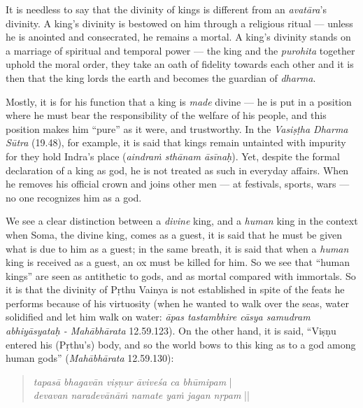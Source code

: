 It is needless to say that the divinity of kings is different from an {\sl avatāra}’s divinity. A king’s divinity is bestowed on him through a religious ritual --- unless he is anointed and consecrated, he remains a mortal. A king’s divinity stands on a marriage of spiritual and temporal power --- the king and the {\sl purohita} together uphold the moral order, they take an oath of fidelity towards each other and it is then that the king lords the earth and becomes the guardian of {\sl dharma}.

Mostly, it is for his function that a king is {\sl made} divine --- he is put in a position where he must bear the responsibility of the welfare of his people, and this position makes him “pure” as it were, and trustworthy. In the {\sl Vasiṣṭha Dharma Sūtra} (19.48), for example, it is said that kings remain untainted with impurity for they hold Indra’s place ({\sl aindraṁ sthānam āsīnaḥ}). Yet, despite the formal declaration of a king as god, he is not treated as such in everyday affairs. When he removes his official crown and joins other men --- at festivals, sports, wars --- no one recognizes him as a god.  

We see a clear distinction between a {\sl divine} king, and a {\sl human} king in the context when Soma, the divine king, comes as a guest, it is said that he must be given what is due to him as a guest; in the same breath, it is said that when a {\sl human} king is received as a guest, an ox must be killed for him.  So we see that “human kings” are seen as antithetic to gods, and as mortal compared with immortals. So it is that the divinity of Pṛthu Vainya is not established in spite of the feats he performs because of his virtuosity (when he wanted to walk over the seas, water solidified and let him walk on water: {\sl āpas tastambhire cāsya samudram abhiyāsyataḥ - Mahābhārata} 12.59.123). On the other hand, it is said, “Viṣṇu entered his (Pṛthu’s) body, and so the world bows to this king as to a god among human gods” ({\sl Mahābhārata} 12.59.130):
\begin{quote}
{\sl tapasā bhagavān viṣṇur āviveśa ca bhūmipam} |\\ 
{\sl devavan naradevānāṁ namate yaṁ jagan nṛpam} ||
\end{quote}

